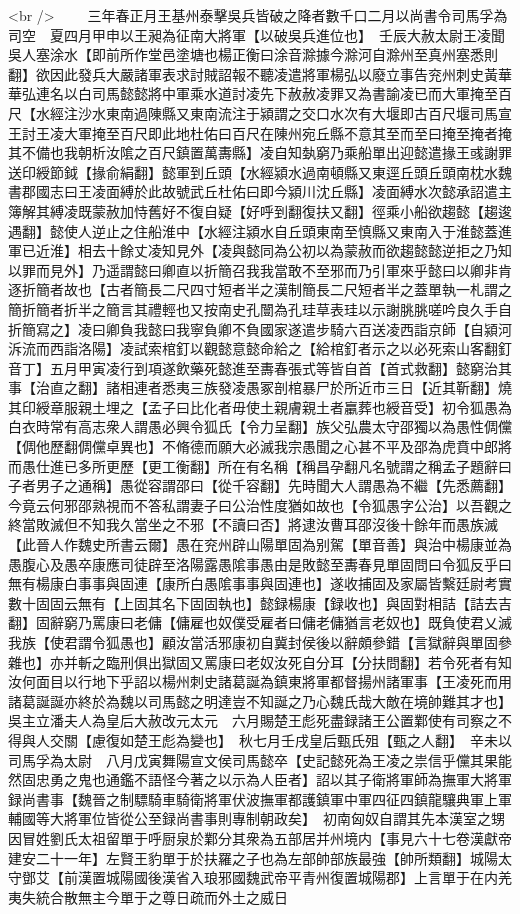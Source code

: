 <br />
　　三年春正月王基州泰擊吳兵皆破之降者數千口二月以尚書令司馬孚為司空　夏四月甲申以王昶為征南大將軍【以破吳兵進位也】　壬辰大赦太尉王凌聞吳人塞涂水【即前所作堂邑塗塘也楊正衡曰涂音滁據今滁河自滁州至真州塞悉則翻】欲因此發兵大嚴諸軍表求討賊詔報不聽凌遣將軍楊弘以廢立事告兖州刺史黃華華弘連名以白司馬懿懿將中軍乘水道討凌先下赦赦凌罪又為書諭凌已而大軍掩至百尺【水經注沙水東南過陳縣又東南流注于潁謂之交口水次有大堰即古百尺堰司馬宣王討王凌大軍掩至百尺即此地杜佑曰百尺在陳州宛丘縣不意其至而至曰掩至掩者掩其不備也我朝析汝隂之百尺鎮置萬夀縣】凌自知埶窮乃乘船單出迎懿遣掾王彧謝罪送印綬節鉞【掾俞絹翻】懿軍到丘頭【水經潁水過南頓縣又東逕丘頭丘頭南枕水魏書郡國志曰王凌面縛於此故號武丘杜佑曰即今潁川沈丘縣】凌面縛水次懿承詔遣主簿解其縛凌既蒙赦加恃舊好不復自疑【好呼到翻復扶又翻】徑乘小船欲趨懿【趨逡遇翻】懿使人逆止之住船淮中【水經注潁水自丘頭東南至慎縣又東南入于淮懿蓋進軍已近淮】相去十餘丈凌知見外【凌與懿同為公初以為蒙赦而欲趨懿懿逆拒之乃知以罪而見外】乃遥謂懿曰卿直以折簡召我我當敢不至邪而乃引軍來乎懿曰以卿非肯逐折簡者故也【古者簡長二尺四寸短者半之漢制簡長二尺短者半之蓋單執一札謂之簡折簡者折半之簡言其禮輕也又按南史孔闓為孔珪草表珪以示謝朓朓嗟吟良久手自折簡寫之】凌曰卿負我懿曰我寧負卿不負國家遂遣步騎六百送凌西詣京師【自潁河泝流而西詣洛陽】凌試索棺釘以觀懿意懿命給之【給棺釘者示之以必死索山客翻釘音丁】五月甲寅凌行到項遂飲藥死懿進至夀春張式等皆自首【首式救翻】懿窮治其事【治直之翻】諸相連者悉夷三族發凌愚冢剖棺暴尸於所近市三日【近其靳翻】燒其印綬章服親土埋之【孟子曰比化者毋使土親膚親土者臝葬也綬音受】初令狐愚為白衣時常有高志衆人謂愚必興令狐氏【令力呈翻】族父弘農太守邵獨以為愚性倜儻【倜他歷翻倜儻卓異也】不脩德而願大必滅我宗愚聞之心甚不平及邵為虎賁中郎將而愚仕進已多所更歷【更工衡翻】所在有名稱【稱昌孕翻凡名號謂之稱孟子題辭曰子者男子之通稱】愚從容謂邵曰【從千容翻】先時聞大人謂愚為不繼【先悉薦翻】今竟云何邪邵熟視而不答私謂妻子曰公治性度猶如故也【令狐愚字公治】以吾觀之終當敗滅但不知我久當坐之不邪【不讀曰否】將逮汝曹耳邵沒後十餘年而愚族滅【此晉人作魏史所書云爾】愚在兖州辟山陽單固為别駕【單音善】與治中楊康並為愚腹心及愚卒康應司徒辟至洛陽露愚隂事愚由是敗懿至夀春見單固問曰令狐反乎曰無有楊康白事事與固連【康所白愚隂事事與固連也】遂收捕固及家屬皆繫廷尉考實數十固固云無有【上固其名下固固執也】懿録楊康【録收也】與固對相詰【詰去吉翻】固辭窮乃罵康曰老傭【傭雇也奴僕受雇者曰傭老傭猶言老奴也】既負使君乂滅我族【使君謂令狐愚也】顧汝當活邪康初自冀封侯後以辭頗參錯【言獄辭與單固參雜也】亦并斬之臨刑俱出獄固又罵康曰老奴汝死自分耳【分扶問翻】若令死者有知汝何面目以行地下乎詔以楊州刺史諸葛誕為鎮東將軍都督揚州諸軍事【王凌死而用諸葛誕誕亦終於為魏以司馬懿之明達豈不知誕之乃心魏氏哉大敵在境帥難其才也】　吳主立潘夫人為皇后大赦改元太元　六月賜楚王彪死盡録諸王公置鄴使有司察之不得與人交關【慮復如楚王彪為變也】　秋七月壬戌皇后甄氏殂【甄之人翻】　辛未以司馬孚為太尉　八月戊寅舞陽宣文侯司馬懿卒【史記懿死為王凌之祟信乎儻其果能然固忠勇之鬼也通鑑不語怪今著之以示為人臣者】詔以其子衛將軍師為撫軍大將軍録尚書事【魏晉之制驃騎車騎衛將軍伏波撫軍都護鎮軍中軍四征四鎮龍驤典軍上軍輔國等大將軍位皆從公至録尚書事則專制朝政矣】　初南匈奴自謂其先本漢室之甥因冒姓劉氏太祖留單于呼厨泉於鄴分其衆為五部居并州境内【事見六十七卷漢獻帝建安二十一年】左賢王豹單于於扶羅之子也為左部帥部族最強【帥所類翻】城陽太守鄧艾【前漢置城陽國後漢省入琅邪國魏武帝平青州復置城陽郡】上言單于在内羌夷失統合散無主今單于之尊日疏而外土之威日